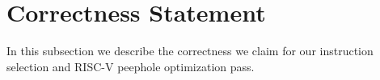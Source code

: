 

\section{Correctness Statement}
In this subsection we describe the correctness we claim for our instruction selection and RISC-V peephole optimization pass.
